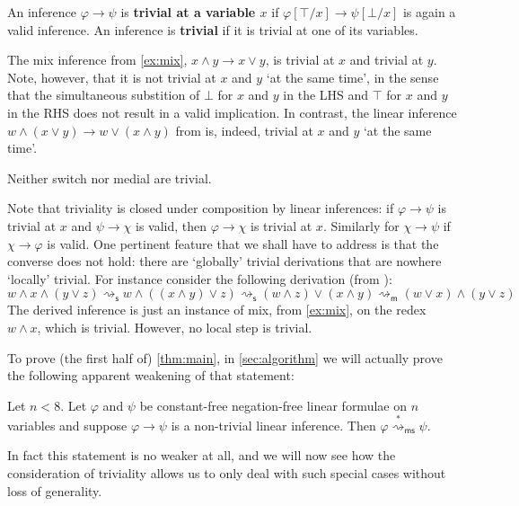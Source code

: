 \documentclass[a4paper, UKenglish, cleveref]{lipics-v2021}
\renewcommand{\phi}{\varphi}
\newcommand{\m}{\ensuremath{\mathsf{m}}}
\newcommand{\s}{\ensuremath{\mathsf{s}}}
\newcommand{\ms}{\ensuremath{\mathsf{ms}}}
\newcommand{\red}{\ensuremath{\overset{*}{\rightsquigarrow}}}
\newcommand{\redms}{\ensuremath{\red_\ms}}
\begin{document}
\begin{definition}
  An inference \(\phi \to \psi\) is \textbf{trivial at a variable \(x\)} if \(\phi[\top/x] \to \psi[\bot/x]\) is again a valid inference.
  An inference is \textbf{trivial} if it is trivial at one of its variables.
\end{definition}


\begin{example}
  The mix inference from \cref{ex:mix}, \(x \land y \to x \lor y\), is trivial at \(x\) and trivial at \(y\).
  Note, however, that it is not trivial at $x$ and $y$ `at the same time', in the sense that the simultaneous substition of $\bot $ for $x$ and $y$ in the LHS and $\top$ for $x$ and $y$ in the RHS does not result in a valid implication.
	In contrast, the linear inference $w \land (x \lor y) \to w \lor (x \land y)$ from \cite{Das13:lin-inf-rew} is, indeed, trivial at $x$ and $y$ {`at the same time'}.

  Neither switch nor medial are trivial.
\end{example}


%
%
%
%
%
%


\begin{remark}
\label{trivial-composition}
Note that triviality is closed under composition by linear inferences: if $\phi \to \psi$ is trivial at $x$ and $\psi \to \chi$ is valid, then $\phi \to \chi$ is trivial at $x$.
Similarly for $\chi \to \psi$ if $\chi \to \phi$ is valid.
One pertinent feature that we shall have to address is that the converse does not hold: there are `globally' trivial derivations that are nowhere `locally' trivial.
For instance consider the following derivation (from \cite[Remark~5.6]{DasStr16:no-compl-lin-sys}):
\[
w \land x \land (y \lor z)
\rightsquigarrow_\s
w \land ((x \land y) \lor z)
\rightsquigarrow_\s
(w\land z) \lor (x \land y)
\rightsquigarrow_\m
(w\lor x) \land (y \lor z)
\]
The derived inference is just an instance of mix, from \cref{ex:mix}, on the redex $w \land x$, which is trivial.
However, no local step is trivial.
\end{remark}

To prove (the first half of) \cref{thm:main}, in \cref{sec:algorithm} we will actually prove the following apparent weakening of that statement:

\begin{theorem}
  \label{thm:main-reduced}
  Let \(n < 8\). Let \(\phi\) and \(\psi\) be constant-free negation-free linear formulae on \(n\) variables and suppose \(\phi \to \psi\) is a non-trivial linear inference. Then \(\phi \redms \psi\).
\end{theorem}
In fact this statement is no weaker at all, and we will now see how the consideration of triviality allows us to only deal with such special cases without loss of generality.
\end{document}
